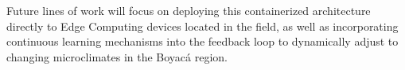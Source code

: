 \documentclass[11pt]{article}
\begin{document}
Future lines of work will focus on deploying this containerized architecture directly to Edge Computing devices located in the field, as well as incorporating continuous learning mechanisms into the feedback loop to dynamically adjust to changing microclimates in the Boyacá region.



\end{document}

